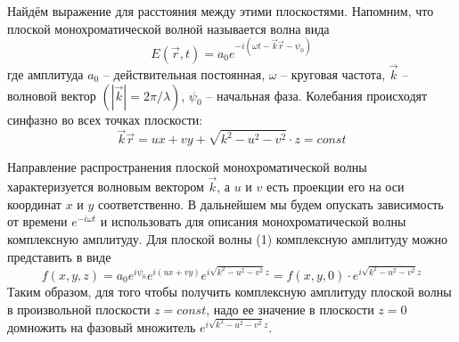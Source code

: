 \documentclass[14pt]{article}
\begin{document}
Найдём выражение для расстояния между этими плоскостями.
Напомним, что плоской монохроматической волной называется
волна вида
\begin{equation}
	E(\vec{r}, t) = a_0e^{-i(\omega t - \vec{k}\vec{r} - \psi_0)}
\end{equation}
\noindent где амплитуда $a_0$ -- действительная постоянная, $\omega$ -- круговая частота,
$\vec{k}$ -- волновой вектор $(|\vec{k}| = 2\pi/\lambda)$, $\psi_0$ -- начальная фаза.
Колебания происходят синфазно во всех точках плоскости:
\begin{equation}
	\vec{k}\vec{r} = ux + vy + \sqrt{k^2 - u^2 - v^2}\cdot z = const
\end{equation}

Направление распространения плоской монохроматической волны
характеризуется волновым вектором
$\vec{k}$, а $u$ и $v$ есть проекции его на оси координат $x$ и $y$ соответственно.
В дальнейшем мы будем опускать зависимость от времени $e^{−i\omega t}$ и использовать для
описания монохроматической волны комплексную амплитуду. Для плоской волны (1)
комплексную амплитуду можно представить в виде
\begin{equation}
	f(x,y,z) = a_0e^{i\psi_0}e^{i(ux + vy)}e^{i\sqrt{k^2 - u^2 - v^2}z} = f(x,y,0)\cdot e^{i\sqrt{k^2 - u^2 - v^2}z}
\end{equation}
\noindent Таким образом, для того чтобы получить комплексную амплитуду
плоской волны в произвольной плоскости $z = const$, надо ее значение в плоскости $z = 0$ домножить на фазовый множитель
$e^{i\sqrt{k^2 - u^2 - v^2}z}$.
\end{document}
